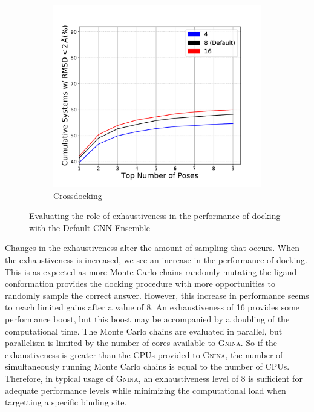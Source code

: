 \documentclass[journal=jcisd8,manuscript=article]{achemso}
\begin{document}
\begin{figure}
\begin{subfigure}[b]{0.48\textwidth}
		\includegraphics[width=\textwidth]{figures/crossdocking/sweep_exhaustiveness_line.pdf}
		\caption{Crossdocking}
		\label{fig:exhaustiveness cd}
        \end{subfigure}    
	\caption{Evaluating the role of exhaustiveness in the performance of docking with the Default CNN Ensemble}
	\label{fig:exhaustiveness}
\end{figure}    

Changes in the exhaustiveness alter the amount of sampling that occurs. When the exhaustiveness is increased, we see an increase in the performance of docking. This is as expected as more Monte Carlo chains randomly mutating the ligand conformation provides the docking procedure with more opportunities to randomly sample the correct answer. However, this increase in performance seems to reach limited gains after a value of 8. An exhaustiveness of 16 provides some performance boost, but this boost may be accompanied by a doubling of the computational time. The Monte Carlo chains are evaluated in parallel, but parallelism is limited by the number of cores available to \textsc{Gnina}. So if the exhaustiveness is greater than the CPUs provided to \textsc{Gnina}, the number of simultaneously running Monte Carlo chains is equal to the number of CPUs. Therefore, in typical usage of \textsc{Gnina}, an exhaustiveness level of 8 is sufficient for adequate performance levels while minimizing the computational load when targetting a specific binding site. 
\end{document}
